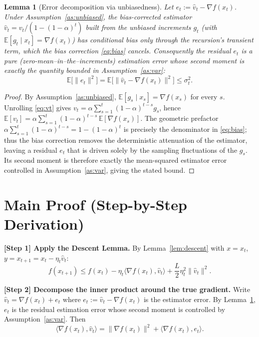 \documentclass[11pt]{article}
\newtheorem{lemma}{Lemma}
\begin{document}
\begin{lemma}[Error decomposition via unbiasedness]\label{lem:unbias}
Let $e_t := \hat v_t - \nabla f(x_t)$. Under Assumption~\ref{as:unbiased},
the bias-corrected estimator $\hat v_t = v_t/(1-(1-\alpha)^t)$ built from the
unbiased increments $g_t$ (with $\mathbb{E}[g_t\mid x_t]=\nabla f(x_t)$) has
conditional bias only through the recursion's transient term, which the bias
correction \eqref{eq:bias} cancels. Consequently the residual $e_t$ is a pure
(zero-mean--in--the--increments) estimation error whose second moment is exactly
the quantity bounded in Assumption~\ref{as:var}:
\[
\mathbb{E}\big[\|e_t\|^2\big]
= \mathbb{E}\big[\|\hat v_t - \nabla f(x_t)\|^2\big] \le \sigma_t^2 .
\]
\end{lemma}
\begin{proof}
By Assumption~\ref{as:unbiased}, $\mathbb{E}[g_s\mid x_s]=\nabla f(x_s)$ for every $s$.
Unrolling \eqref{eq:vt} gives
$v_t = \alpha\sum_{s=1}^t (1-\alpha)^{t-s} g_s$, hence
$\mathbb{E}[v_t] = \alpha\sum_{s=1}^t (1-\alpha)^{t-s}\,\mathbb{E}[\nabla f(x_s)]$.
The geometric prefactor $\alpha\sum_{s=1}^t(1-\alpha)^{t-s} = 1-(1-\alpha)^t$ is precisely
the denominator in \eqref{eq:bias}; thus the bias correction removes the deterministic
attenuation of the estimator, leaving a residual $e_t$ that is driven solely by the
sampling fluctuations of the $g_s$. Its second moment is therefore exactly the
mean-squared estimator error controlled in Assumption~\ref{as:var}, giving the stated bound.
\end{proof}

\section*{Main Proof (Step-by-Step Derivation)}

\noindent\textbf{[Step 1] Apply the Descent Lemma.}
By Lemma~\ref{lem:descent} with $x=x_t$, $y=x_{t+1}=x_t-\eta_t\hat v_t$:
\[
f(x_{t+1}) \le f(x_t) - \eta_t \langle \nabla f(x_t), \hat v_t\rangle
+ \frac{L}{2}\eta_t^2 \|\hat v_t\|^2.
\tag{S1}
\]

\noindent\textbf{[Step 2] Decompose the inner product around the true gradient.}
Write $\hat v_t = \nabla f(x_t) + e_t$ where $e_t := \hat v_t - \nabla f(x_t)$ is the
estimator error. By Lemma~\ref{lem:unbias}, $e_t$ is the residual estimation error
whose second moment is controlled by Assumption~\ref{as:var}. Then
\[
\langle \nabla f(x_t), \hat v_t\rangle
= \|\nabla f(x_t)\|^2 + \langle \nabla f(x_t), e_t\rangle.
\tag{S2}
\]
\end{document}
